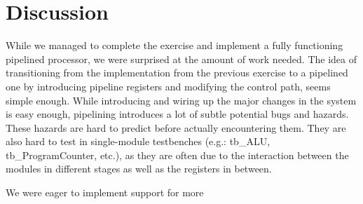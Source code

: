 \chapter{Discussion}

While we managed to complete the exercise and implement a fully functioning pipelined processor, we were surprised at the amount of work needed.
The idea of transitioning from the implementation from the previous exercise to a pipelined one by introducing pipeline registers and modifying the control path, seems simple enough.
While introducing and wiring up the major changes in the system is easy enough, pipelining introduces a lot of subtle potential bugs and hazards.
These hazards are hard to predict before actually encountering them.
They are also hard to test in single-module testbenches (e.g.: tb\_ALU, tb\_ProgramCounter, etc.), as they are often due to the interaction between the modules in different stages as well as the registers in between.

We were eager to implement support for more 

